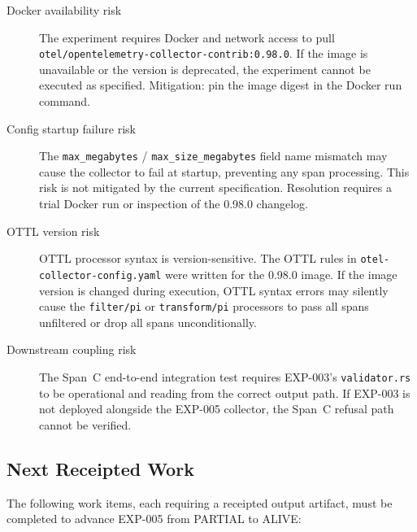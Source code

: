 \begin{description}
  \item[Docker availability risk] The experiment requires Docker and network access to pull
        \texttt{otel/opentelemetry-collector-contrib:0.98.0}. If the image is unavailable or
        the version is deprecated, the experiment cannot be executed as specified. Mitigation:
        pin the image digest in the Docker run command.

  \item[Config startup failure risk] The \texttt{max\_megabytes} / \texttt{max\_size\_megabytes}
        field name mismatch may cause the collector to fail at startup, preventing any span
        processing. This risk is not mitigated by the current specification. Resolution
        requires a trial Docker run or inspection of the 0.98.0 changelog.

  \item[OTTL version risk] OTTL processor syntax is version-sensitive. The OTTL rules in
        \texttt{otel-collector-config.yaml} were written for the 0.98.0 image. If the image
        version is changed during execution, OTTL syntax errors may silently cause the
        \texttt{filter/pi} or \texttt{transform/pi} processors to pass all spans unfiltered
        or drop all spans unconditionally.

  \item[Downstream coupling risk] The Span~C end-to-end integration test requires EXP-003's
        \texttt{validator.rs} to be operational and reading from the correct output path.
        If EXP-003 is not deployed alongside the EXP-005 collector, the Span~C refusal path
        cannot be verified.
\end{description}

\subsection{Next Receipted Work}
\label{sec:otel-weaver-exp-005-collector-to-intake-open-questions-next}

The following work items, each requiring a receipted output artifact, must be completed to
advance EXP-005 from PARTIAL to ALIVE:

